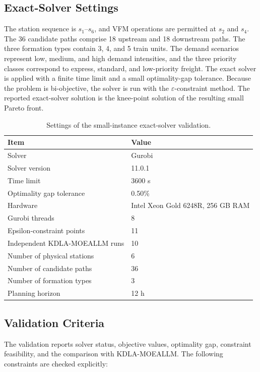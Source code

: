 \documentclass[11pt]{article}
\begin{document}
\subsection{Exact-Solver Settings}

The station sequence is $s_1$--$s_6$, and VFM operations are permitted at $s_2$ and $s_4$. The 36 candidate paths comprise 18 upstream and 18 downstream paths. The three formation types contain 3, 4, and 5 train units. The demand scenarios represent low, medium, and high demand intensities, and the three priority classes correspond to express, standard, and low-priority freight. The exact solver is applied with a finite time limit and a small optimality-gap tolerance. Because the problem is bi-objective, the solver is run with the $\varepsilon$-constraint method. The reported exact-solver solution is the knee-point solution of the resulting small Pareto front.

\begin{table}[!htbp]
	\centering
	\small
	\caption{Settings of the small-instance exact-solver validation.}
\label{AppTab:exactSettings}
	\begin{tabular}{ll}
		\toprule
		\textbf{Item} & \textbf{Value} \\
		\midrule
		Solver & Gurobi \\
		Solver version & 11.0.1 \\
		Time limit & 3600 s \\
		Optimality gap tolerance & 0.50\% \\
		Hardware & Intel Xeon Gold 6248R, 256 GB RAM \\
		Gurobi threads & 8 \\
		Epsilon-constraint points & 11 \\
		Independent KDLA-MOEALLM runs & 10 \\
		Number of physical stations & 6 \\
		Number of candidate paths & 36 \\
		Number of formation types & 3 \\
		Planning horizon & 12 h \\
		\bottomrule
	\end{tabular}
\end{table}

\subsection{Validation Criteria}

The validation reports solver status, objective values, optimality gap, constraint feasibility, and the comparison with KDLA-MOEALLM. The following constraints are checked explicitly:
\end{document}
